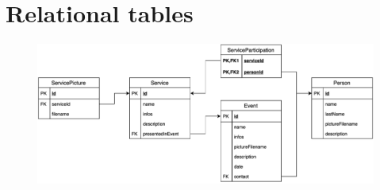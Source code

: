 \documentclass[a4paper, 11pt, parskip=half, headsepline]{scrreprt}
\begin{document}
\section{Relational tables}

\begin{figure}[H]
    \centering
    \includegraphics[width=0.85\linewidth, keepaspectratio]{DB/RelationalTables}
\end{figure}
\end{document}
